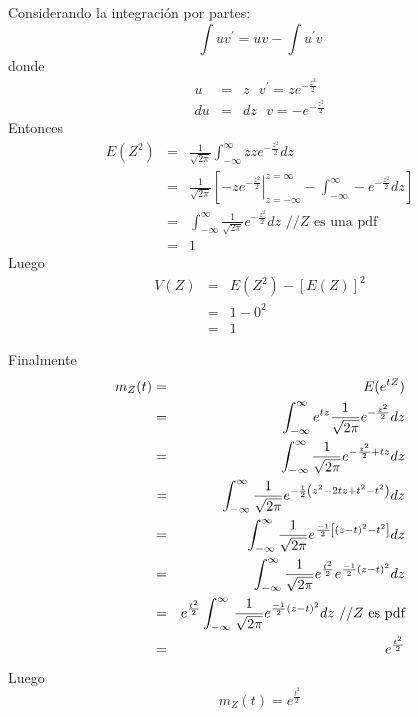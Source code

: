 \begin{i}
Considerando la integración por partes:
\begin{equation*}
\int uv^{\prime }=uv-\int u^{\prime }v
\end{equation*}
donde
\begin{eqnarray*}
u &=&z\text{ \ \ \ \ \ }v^{\prime }=ze^{-\frac{z^{2}}{2}} \\
du &=&dz\text{ \ \ \ }v=-e^{-\frac{z^{2}}{2}}
\end{eqnarray*}
Entonces%
\begin{eqnarray*}
E(Z^{2}) &=&\frac{1}{\sqrt{2\pi }}\int_{-\infty }^{\infty }zze^{-\frac{z^{2}
}{2}}dz \\
&=&\frac{1}{\sqrt{2\pi }}\left[ \left. -ze^{-\frac{z^{2}}{2}}\right\vert
_{z=-\infty }^{z=\infty }-\int_{-\infty }^{\infty }-e^{-\frac{z^{2}}{2}}dz
\right] \\
&=&\int_{-\infty }^{\infty }\frac{1}{\sqrt{2\pi }}e^{-\frac{z^{2}}{2}}dz%
\text{ \ \ \ //}Z\text{ es una pdf} \\
&=&1
\end{eqnarray*}
Luego 
\begin{eqnarray*}
V(Z) &=&E(Z^{2})-\left[ E(Z)\right] ^{2} \\
&=&1-0^{2} \\
&=&1
\end{eqnarray*}

Finalmente 
\begin{eqnarray*}
m_{Z}(t) &=&E(e^{tZ}) \\
&=&\int_{-\infty }^{\infty }e^{tz}\frac{1}{\sqrt{2\pi }}e^{-\frac{z^{2}}{2}
}dz \\
&=&\int_{-\infty }^{\infty }\frac{1}{\sqrt{2\pi }}e^{-\frac{z^{2}}{2}+tz}dz
\\
&=&\int_{-\infty }^{\infty }\frac{1}{\sqrt{2\pi }}e^{-\frac{1}{2}\left(
z^{2}-2tz+t^{2}-t^{2}\right) }dz \\
&=&\int_{-\infty }^{\infty }\frac{1}{\sqrt{2\pi }}e^{\frac{-1}{2}\left[
(z-t)^{2}-t^{2}\right] }dz \\
&=&\int_{-\infty }^{\infty }\frac{1}{\sqrt{2\pi }}e^{\frac{t^{2}}{2}}e^{%
\frac{-1}{2}(z-t)^{2}}dz \\
&=&e^{\frac{t^{2}}{2}}\int_{-\infty }^{\infty }\frac{1}{\sqrt{2\pi }}e^{%
\frac{-1}{2}(z-t)^{2}}dz\text{ //}Z\text{ es pdf} \\
&=&e^{\frac{t^{2}}{2}}
\end{eqnarray*}
Luego%
\begin{equation*}
m_{Z}(t)=e^{\frac{t^{2}}{2}}
\end{equation*}


\end{i}
